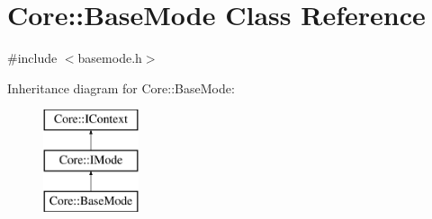 \hypertarget{class_core_1_1_base_mode}{\section{\-Core\-:\-:\-Base\-Mode \-Class \-Reference}
\label{class_core_1_1_base_mode}
}


{\ttfamily \#include $<$basemode.\-h$>$}

\-Inheritance diagram for \-Core\-:\-:\-Base\-Mode\-:\begin{figure}[H]
\begin{center}
\leavevmode
\includegraphics[height=3.000000cm]{class_core_1_1_base_mode}
\end{center}
\end{figure}
